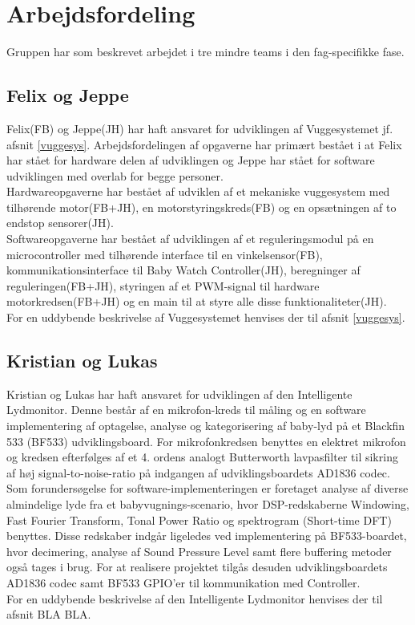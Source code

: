 \section{Arbejdsfordeling}

Gruppen har som beskrevet arbejdet i tre mindre teams i den fag-specifikke fase. 

\subsection*{Felix og Jeppe}
Felix(FB) og Jeppe(JH) har haft ansvaret for udviklingen af Vuggesystemet jf. afsnit \vref{vuggesys}. Arbejdsfordelingen af opgaverne har primært bestået i at Felix har stået for hardware delen af udviklingen og Jeppe har stået for software udviklingen med overlab for begge personer.\\ Hardwareopgaverne har bestået af udviklen af et mekaniske vuggesystem med tilhørende motor(FB+JH), en motorstyringskreds(FB) og en opsætningen af to endstop sensorer(JH).\\
Softwareopgaverne har bestået af udviklingen af et reguleringsmodul på en microcontroller med tilhørende interface til en vinkelsensor(FB), kommunikationsinterface til Baby Watch Controller(JH), beregninger af reguleringen(FB+JH), styringen af et PWM-signal til hardware motorkredsen(FB+JH) og en main til at styre alle disse funktionaliteter(JH). \\
For en uddybende beskrivelse af Vuggesystemet henvises der til afsnit \vref{vuggesys}.
\subsection*{Kristian og Lukas}
Kristian og Lukas har haft ansvaret for udviklingen af den Intelligente Lydmonitor. Denne består af en mikrofon-kreds til måling  og en software implementering af optagelse, analyse og kategorisering af baby-lyd på et Blackfin 533 (BF533) udviklingsboard. For mikrofonkredsen benyttes en elektret mikrofon og kredsen efterfølges af et 4. ordens analogt Butterworth lavpasfilter til sikring af høj signal-to-noise-ratio på indgangen af udviklingsboardets AD1836 codec. Som forundersøgelse for software-implementeringen er foretaget analyse af diverse almindelige lyde fra et babyvugnings-scenario, hvor DSP-redskaberne Windowing, Fast Fourier Transform, Tonal Power Ratio og spektrogram (Short-time DFT) benyttes. Disse redskaber indgår ligeledes ved implementering på BF533-boardet, hvor decimering, analyse af Sound Pressure Level samt flere buffering metoder også tages i brug. For at realisere projektet tilgås desuden udviklingsboardets AD1836 codec samt BF533 GPIO'er til kommunikation med Controller.  \\
For en uddybende beskrivelse af den Intelligente Lydmonitor henvises der til afsnit BLA BLA.


